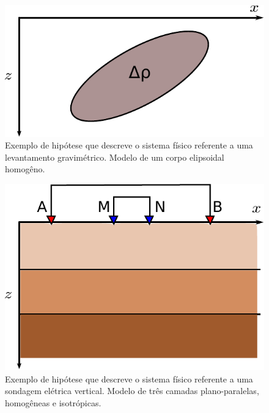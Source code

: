\begin{figure}
    \centering
    \includegraphics[scale=1]{figs/hipotese-grav}
    \caption{Exemplo de hipótese que descreve o sistema físico referente a uma
    levantamento gravimétrico.
    Modelo de um corpo elipsoidal homogêno.}
    \label{fig:hipotese-grav}
\end{figure}

\begin{figure}
    \centering
    \includegraphics[scale=1]{figs/hipotese-sev}
    \caption{Exemplo de hipótese que descreve o sistema físico referente a uma
    sondagem elétrica vertical.
    Modelo de três camadas plano-paralelas, homogêneas e isotrópicas.}
    \label{fig:hipotese-sev}
\end{figure}

